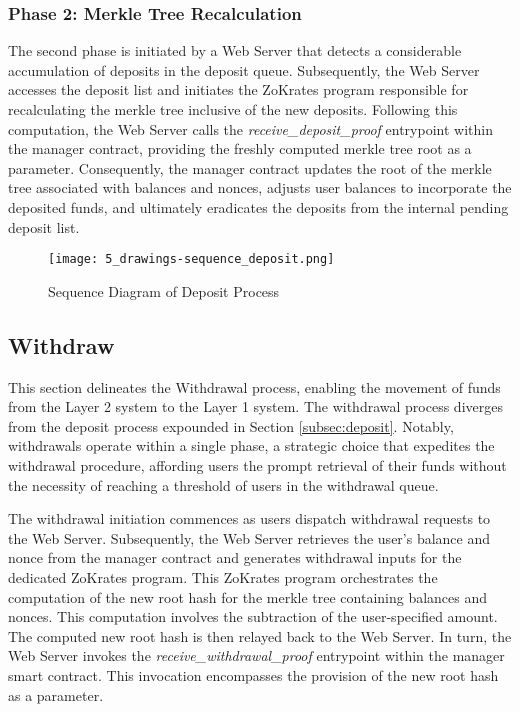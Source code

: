 \subsubsection{Phase 2: Merkle Tree Recalculation}
The second phase is initiated by a Web Server that detects a considerable accumulation of deposits in the deposit queue. Subsequently, the Web Server accesses the deposit list and initiates the ZoKrates program responsible for recalculating the merkle tree inclusive of the new deposits. Following this computation, the Web Server calls the \textit{receive\_deposit\_proof} entrypoint within the manager contract, providing the freshly computed merkle tree root as a parameter. Consequently, the manager contract updates the root of the merkle tree associated with balances and nonces, adjusts user balances to incorporate the deposited funds, and ultimately eradicates the deposits from the internal pending deposit list.

\begin{figure}[ht]
	\centering
	\texttt{[image: 5\_drawings-sequence\_deposit.png]}
	\caption[Scaling Solutions]{Sequence Diagram of Deposit Process}  
	\label{fig:5_drawings-sequence_deposit.png}
  \end{figure} 

  \subsection{Withdraw}
  This section delineates the Withdrawal process, enabling the movement of funds from the Layer 2 system to the Layer 1 system. The withdrawal process diverges from the deposit process expounded in Section \ref{subsec:deposit}. Notably, withdrawals operate within a single phase, a strategic choice that expedites the withdrawal procedure, affording users the prompt retrieval of their funds without the necessity of reaching a threshold of users in the withdrawal queue.
  
  The withdrawal initiation commences as users dispatch withdrawal requests to the Web Server. Subsequently, the Web Server retrieves the user's balance and nonce from the manager contract and generates withdrawal inputs for the dedicated ZoKrates program. This ZoKrates program orchestrates the computation of the new root hash for the merkle tree containing balances and nonces. This computation involves the subtraction of the user-specified amount. The computed new root hash is then relayed back to the Web Server. In turn, the Web Server invokes the \textit{receive\_withdrawal\_proof} entrypoint within the manager smart contract. This invocation encompasses the provision of the new root hash as a parameter.
  
